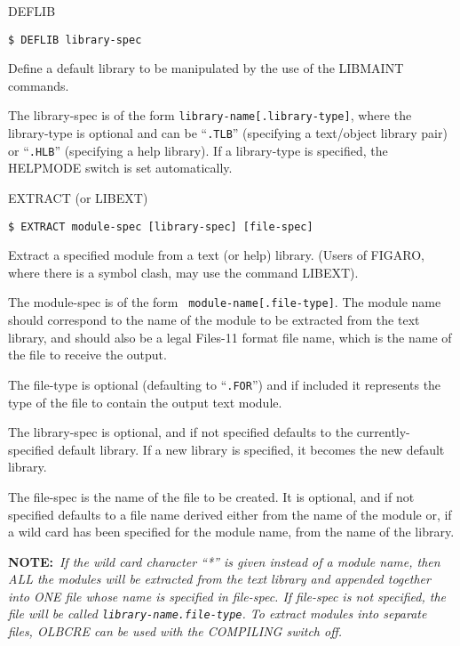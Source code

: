 \begin{list}{}{\setlength{\labelwidth}{\numlen}\setlength{\leftmargin}{\numlen}
\addtolength{\leftmargin}{\labelsep}}

\item[DEFLIB]
\begin{verbatim}
$ DEFLIB library-spec
\end{verbatim}
Define a default library to be manipulated by the use of
the LIBMAINT commands.

The library-spec is of the form {\tt library-name[.library-type]}, where the
library-type is optional and can be ``{\tt .TLB}'' (specifying a text/object
library pair) or ``{\tt .HLB}'' (specifying a help library).
If a library-type is specified, the HELPMODE switch is set
automatically.

\item[EXTRACT (or LIBEXT)]
\begin{verbatim}
$ EXTRACT module-spec [library-spec] [file-spec]
\end{verbatim}
Extract a specified module from a text (or help) library.
(Users of FIGARO, where there is a symbol clash, may use
the command LIBEXT).

The module-spec is of the form ~{\tt module-name[.file-type]}.
The module name should correspond to the name of the module to be
extracted from the text library, and should also be a legal Files-11
format file name, which is the name of the file to receive the output.

The file-type is optional (defaulting to ``{\tt .FOR}'') and if included it
represents the type of the file to contain the output text module.

The library-spec is optional, and if not specified defaults to the
currently-specified default library.
If a new library is specified, it becomes the new default library.

The file-spec is the name of the file to be created.
It is optional, and if not specified defaults to a file name
derived either from the name of the module or,
if a wild card has been specified for the module name, from the name of
the library. 

{\bf NOTE:}~{\it If the wild card character ``*'' is given instead of a module 
name, then ALL the modules will be extracted from the text library and appended
together into ONE file whose name is specified in file-spec. If file-spec is 
not specified, the file will be called {\tt library-name.file-type}.
To extract modules into separate files, OLBCRE can be used with
the COMPILING switch off.}


\end{list}
